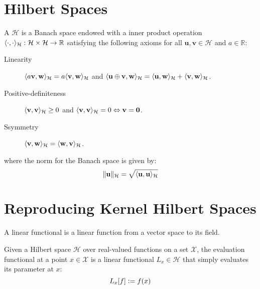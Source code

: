 \section{Hilbert Spaces}

\begin{definition}
A  $\mathcal{H}$ is a Banach space endowed with a inner product operation $\langle\cdot, \cdot\rangle_\mathcal{H} : \mathcal{H} \times \mathcal{H} \to \mathbb{R}$ satisfying the following axioms for all $\mathbf{u}, \mathbf{v} \in \mathcal{H}$ and $a \in \mathbb{R}$:
%
\begin{description}
  \item[Linearity] $\langle a \mathbf{v}, \mathbf{w}\rangle_\mathcal{H} = a \langle\mathbf{v}, \mathbf{w}\rangle_\mathcal{H}$ and $\langle\mathbf{u} \oplus \mathbf{v}, \mathbf{w}\rangle_\mathcal{H} = \langle\mathbf{u}, \mathbf{w}\rangle_\mathcal{H} + \langle\mathbf{v}, \mathbf{w}\rangle_\mathcal{H}$.
  \item[Positive-definiteness] $\langle\mathbf{v}, \mathbf{v}\rangle_\mathcal{H} \geq 0$ and $\langle\mathbf{v}, \mathbf{v}\rangle_\mathcal{H} = 0 \Leftrightarrow \mathbf{v} = \mathbf{0}$.
  \item[Ssymmetry] $\langle\mathbf{v}, \mathbf{w}\rangle_\mathcal{H} = \langle\mathbf{w}, \mathbf{v}\rangle_\mathcal{H}$.
\end{description}
%
where the norm for the Banach space is given by:
%
\begin{equation}
  \lVert\mathbf{u}\rVert_\mathcal{H} = \sqrt{\langle\mathbf{u}, \mathbf{u}\rangle_\mathcal{H}}
\end{equation}
%
\end{definition}

\section{Reproducing Kernel Hilbert Spaces}
A linear functional is a linear function from a vector space to its field.

\begin{definition}
Given a Hilbert space $\mathcal{H}$ over real-valued functions on a set $\mathcal{X}$, the evaluation functional at a point $x \in \mathcal{X}$ is a linear functional $L_x \in \mathcal{H}$ that simply evaluates its parameter at $x$:
\begin{equation}
  L_x[f] \vcentcolon= f(x)
\end{equation}
\end{definition}

